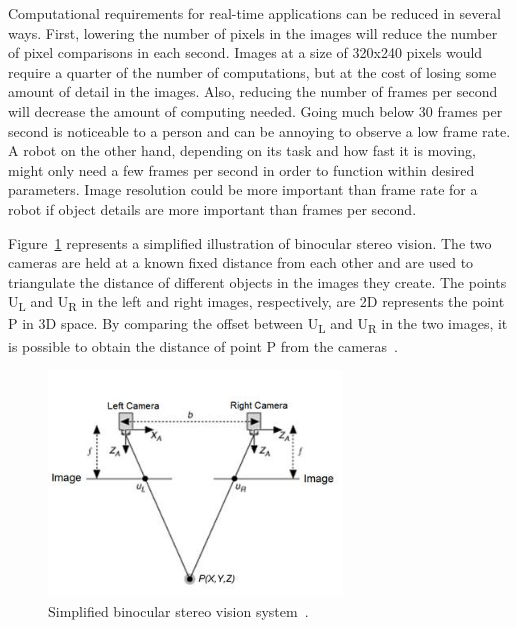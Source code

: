 Computational requirements for real-time applications can be reduced in several ways. First, lowering the number of pixels in the images will reduce the number of pixel comparisons in each second. Images at a size of 320x240 pixels would require a quarter of the number of computations, but at the cost of losing some amount of detail in the images. Also, reducing the number of frames per second will decrease the amount of computing needed. Going much below 30 frames per second is noticeable to a person and can be annoying to observe a low frame rate. A robot on the other hand, depending on its task and how fast it is moving, might only need a few frames per second in order to function within desired parameters. Image resolution could be more important than frame rate for a robot if object details are more important than frames per second.

Figure~\ref{fig:sv_diagram} represents a simplified illustration of binocular stereo vision. The two cameras are held at a known fixed distance from each other and are used to triangulate the distance of different objects in the images they create. The points U\textsubscript{L} and U\textsubscript{R} in the left and right images, respectively, are 2D represents the point P in 3D space. By comparing the offset between U\textsubscript{L} and U\textsubscript{R} in the two images, it is possible to obtain the distance of point P from the cameras~\cite{stereoVisionDiagram}.

\begin{figure}[h]
	\begin{center}
		\includegraphics[height=60mm]{figures/stereoVisionDiagram.jpg}
		\captionfonts
		\caption{Simplified binocular stereo vision system~\cite{stereoVisionDiagram}.}
		\label{fig:sv_diagram}
	\end{center}
\end{figure}


